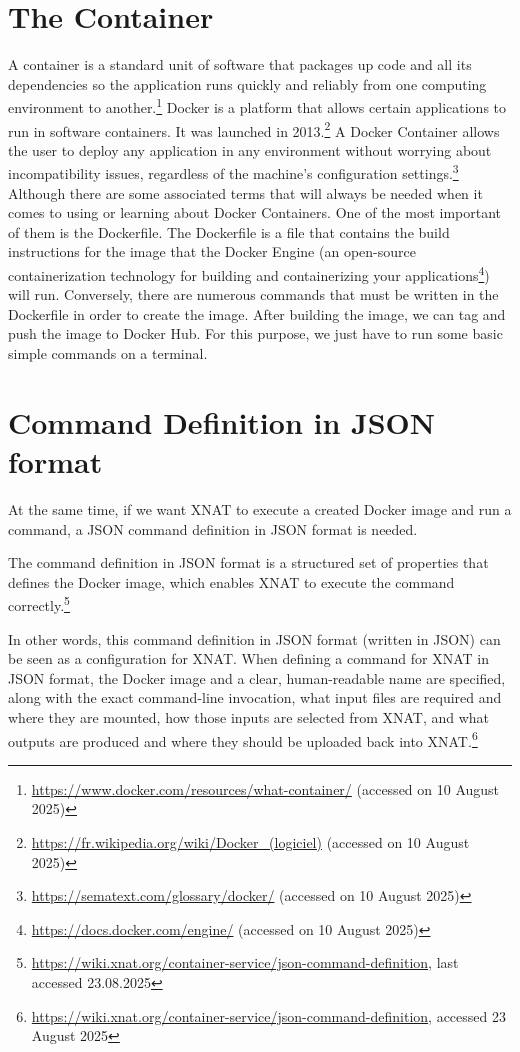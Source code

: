 \section{The Container}
A container is a standard unit of software that packages up code and all its dependencies so the application runs quickly and reliably from one computing environment to another.\footnote{\url{https://www.docker.com/resources/what-container/} (accessed on 10 August 2025)}
Docker is a platform that allows certain applications to run in software containers. It was launched in 2013.\footnote{\url{https://fr.wikipedia.org/wiki/Docker\_(logiciel)} (accessed on 10 August 2025)} A Docker Container allows the user to deploy any application in any environment without worrying about incompatibility issues, regardless of the machine’s configuration settings.\footnote{\url{https://sematext.com/glossary/docker/} (accessed on 10 August 2025)} Although there are some associated terms that will always be needed when it comes to using or learning about Docker Containers.
One of the most important of them is the Dockerfile. The Dockerfile is a file that contains the build instructions for the image that the Docker Engine (an open-source containerization technology for building and containerizing your applications\footnote{\url{https://docs.docker.com/engine/} (accessed on 10 August 2025)}) will run. Conversely, there are numerous commands that must be written in the Dockerfile in order to create the image. After building the image, we can tag and push the image to Docker Hub. For this purpose, we just have to run some basic simple commands on a terminal.
\\
\section{Command Definition in JSON format}
At the same time, if we want XNAT to execute a created Docker image and run a command, a \ac{JSON} command definition in JSON format is needed. 

The command definition in JSON format is a structured set of properties that defines the Docker image, which enables XNAT to execute the command correctly.\footnote{\url{https://wiki.xnat.org/container-service/json-command-definition}, last accessed 23.08.2025}

In other words, this command definition in JSON format (written in JSON) can be seen as a configuration for XNAT. When defining a command for XNAT in JSON format, the Docker image and a clear, human-readable name are specified, along with the exact command-line invocation, what input files are required and where they are mounted, how those inputs are selected from XNAT, and what outputs are produced and where they should be uploaded back into XNAT.\footnote{\url{https://wiki.xnat.org/container-service/json-command-definition}, accessed 23 August 2025}

